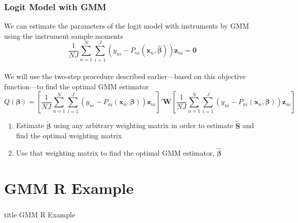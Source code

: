 \documentclass{beamer}
\begin{document}
\begin{frame}\frametitle{Logit Model with GMM}
    We can estimate the parameters of the logit model with instruments by GMM using the instrument sample moments
    $$\frac{1}{NJ} \sum_{n = 1}^N \sum_{i = 1}^J \left( y_{ni} - P_{ni}(\bm{x}_n, \widehat{\bm{\beta}}) \right) \bm{z}_{ni} = \bm{0}$$ \\
    \vspace{2ex}
    We will use the two-step procedure described earlier---based on this objective function---to find the optimal GMM estimator \\
    \vspace{1ex}
    {\scriptsize $$Q(\bm{\beta}) = \left[ \frac{1}{NJ} \sum_{n = 1}^N \sum_{i = 1}^J \left( y_{ni} - P_{ni}(\bm{x}_n, \bm{\beta}) \right) \bm{z}_{ni} \right]' \bm{W} \left[ \frac{1}{NJ} \sum_{n = 1}^N \sum_{i = 1}^J \left( y_{ni} - P_{ni}(\bm{x}_n, \bm{\beta}) \right) \bm{z}_{ni} \right]$$}
    \begin{enumerate}
    	\item Estimate $\widetilde{\bm{\beta}}$ using any arbitrary weighting matrix in order to estimate $\widetilde{\bm{S}}$ and find the optimal weighting matrix
    	\item Use that weighting matrix to find the optimal GMM estimator, $\widehat{\bm{\beta}}$
    \end{enumerate}
\end{frame}

\section{GMM R Example}
\label{example}
\begin{frame}\frametitle{}
    \vfill
    \centering
    \begin{beamercolorbox}[center]{title}
        \Large GMM R Example
    \end{beamercolorbox}
    \vfill
\end{frame}
\end{document}
